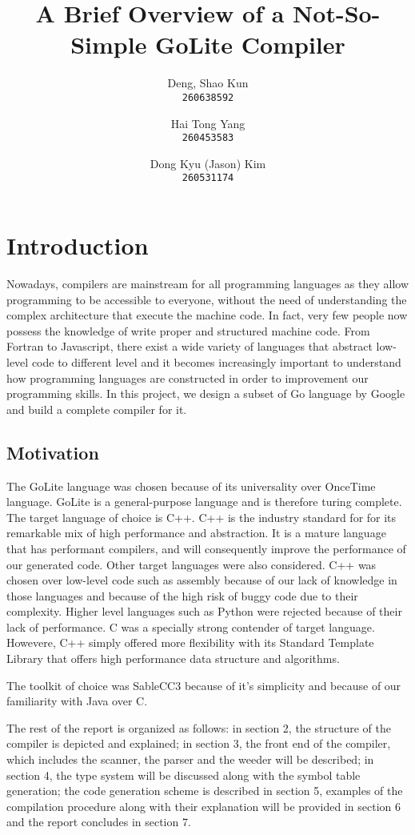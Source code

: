 \documentclass[a4paper]{article}
\title{A Brief Overview of a Not-So-Simple GoLite Compiler}
\author{
  Deng, Shao Kun\\
  \texttt{260638592}
  \and
  Hai Tong Yang\\
  \texttt{260453583}
  \and
  Dong Kyu (Jason) Kim\\
  \texttt{260531174}  
}
\begin{document}
\maketitle
\section{Introduction}

Nowadays, compilers are mainstream for all programming languages as they allow programming to be accessible to everyone, without the need of understanding the complex architecture that execute the machine code. In fact, very few people now possess the knowledge of write proper and structured machine code. From Fortran to Javascript, there exist a wide variety of languages that abstract low-level code to different level and it becomes increasingly important to understand how programming languages are constructed in order to improvement our programming skills. In this project, we design a subset of Go language by Google and build a complete compiler for it. 
\subsection{Motivation}
The GoLite language was chosen because of its universality over OnceTime language. GoLite is a general-purpose language and is therefore turing complete. The target language of choice is C++. C++ is the industry standard for for its remarkable mix of high performance and abstraction. It is a mature language that has performant compilers, and will consequently improve the performance of our generated code. Other target languages were also considered. C++ was chosen over low-level code such as assembly because of our lack of knowledge in those languages and because of the high risk of buggy code due to their complexity. Higher level languages such as Python were rejected because of their lack of performance. C was a specially strong contender of target language. Howevere, C++ simply offered more flexibility with its Standard Template Library that offers high performance data structure and algorithms.

The toolkit of choice was SableCC3 because of it's simplicity and because of our familiarity with Java over C.

The rest of the report is organized as follows: in section 2, the structure of the compiler is depicted and explained; in section 3, the front end of the compiler, which includes the scanner, the parser and the weeder will be described; in section 4, the type system will be discussed along with the symbol table generation; the code generation scheme is described in section 5, examples of the compilation procedure along with their explanation will be provided in section 6 and the report concludes in section 7.
\end{document}
